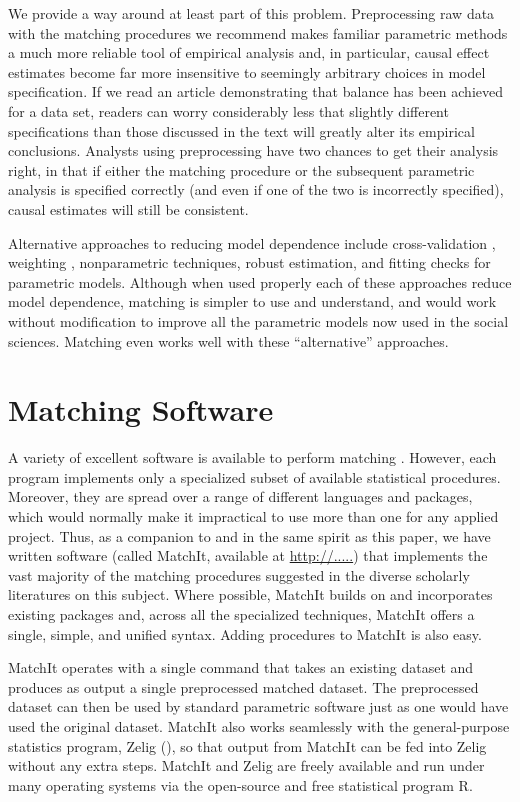 \documentclass[11pt,titlepage]{article}
\begin{document}
We provide a way around at least part of this problem.  Preprocessing
raw data with the matching procedures we recommend makes familiar
parametric methods a much more reliable tool of empirical analysis
and, in particular, causal effect estimates become far more
insensitive to seemingly arbitrary choices in model specification.  If
we read an article demonstrating that balance has been achieved for a
data set, readers can worry considerably less that slightly different
specifications than those discussed in the text will greatly alter its
empirical conclusions.  Analysts using preprocessing have two chances
to get their analysis right, in that if either the matching procedure
or the subsequent parametric analysis is specified correctly (and even
if one of the two is incorrectly specified), causal estimates will
still be consistent.

Alternative approaches to reducing model dependence include
cross-validation \citep{BlaSmi04}, weighting \citep{RobRot03,
  HirImbRid03}, nonparametric techniques, robust estimation, and
fitting checks for parametric models.  Although when used properly
each of these approaches reduce model dependence, matching is simpler
to use and understand, and would work without modification to improve
all the parametric models now used in the social sciences.  Matching
even works well with these ``alternative'' approaches.

\appendix
\section{Matching Software}\label{s:matchit}

A variety of excellent software is available to perform matching
\citep{AbaDruLeb02, BecIch02, BerKos03, Hansen05, LeuSia04, Parsons00,
  Parsons01, Sekhon04}.  However, each program implements only a
specialized subset of available statistical procedures.  Moreover,
they are spread over a range of different languages and packages,
which would normally make it impractical to use more than one for any
applied project.  Thus, as a companion to and in the same spirit as
this paper, we have written software (called MatchIt, available at
\url{http://.....})  that implements the vast majority of the matching
procedures suggested in the diverse scholarly literatures on this
subject.  Where possible, MatchIt builds on and incorporates existing
packages and, across all the specialized techniques, MatchIt offers a
single, simple, and unified syntax.  Adding procedures to MatchIt is
also easy.

MatchIt operates with a single command that takes an existing dataset
and produces as output a single preprocessed matched dataset.  The
preprocessed dataset can then be used by standard parametric software
just as one would have used the original dataset.  MatchIt also works
seamlessly with the general-purpose statistics program, Zelig
(\citealt{ImaKinLau04}), so that output from MatchIt can be fed into
Zelig without any extra steps.  MatchIt and Zelig are freely available
and run under many operating systems via the open-source and free
statistical program R.

\baselineskip 


\end{document}
